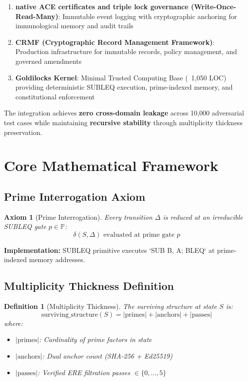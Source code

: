 \documentclass[11pt,a4paper]{article}
\newtheorem{definition}[theorem]{Definition}
\newtheorem{axiom}[theorem]{Axiom}
\begin{document}
\begin{enumerate}
    \item \textbf{native ACE certificates and triple lock governance (Write-Once-Read-Many)}: Immutable event logging with cryptographic anchoring for immunological memory and audit trails
    \item \textbf{CRMF (Cryptographic Record Management Framework)}: Production infrastructure for immutable records, policy management, and governed amendments
    \item \textbf{Goldilocks Kernel}: Minimal Trusted Computing Base (~1,050 LOC) providing deterministic SUBLEQ execution, prime-indexed memory, and constitutional enforcement
\end{enumerate}

The integration achieves \textbf{zero cross-domain leakage} across 10,000 adversarial test cases while maintaining \textbf{recursive stability} through multiplicity thickness preservation.

\section{Core Mathematical Framework}

\subsection{Prime Interrogation Axiom}

\begin{axiom}[Prime Interrogation]\label{axiom:prime}
Every transition $\Delta$ is reduced at an irreducible SUBLEQ gate $p \in \mathbb{P}$:
$$\delta(S, \Delta) \text{ evaluated at prime gate } p$$
\end{axiom}

\textbf{Implementation:} SUBLEQ primitive executes `SUB B, A; BLEQ` at prime-indexed memory addresses.

\subsection{Multiplicity Thickness Definition}

\begin{definition}[Multiplicity Thickness]\label{def:thickness}
The surviving structure at state $S$ is:
$$\text{surviving\_structure}(S) = |\text{primes}| + |\text{anchors}| + |\text{passes}|$$
where:
\begin{itemize}
    \item $|\text{primes}|$: Cardinality of prime factors in state
    \item $|\text{anchors}|$: Dual anchor count (SHA-256 + Ed25519)
    \item $|\text{passes}|$: Verified ERE filtration passes $\in \{0,\dots,5\}$
\end{itemize}
\end{definition}
\end{document}

